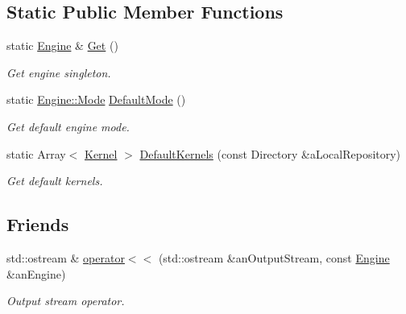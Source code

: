 \subsection*{Static Public Member Functions}
\begin{DoxyCompactItemize}
\item 
static \hyperlink{classlibrary_1_1physics_1_1env_1_1ephem_1_1spice_1_1_engine}{Engine} \& \hyperlink{classlibrary_1_1physics_1_1env_1_1ephem_1_1spice_1_1_engine_a9d5058448b12c353edcf5a420cec2745}{Get} ()
\begin{DoxyCompactList}\small\item\em Get engine singleton. \end{DoxyCompactList}\item 
static \hyperlink{classlibrary_1_1physics_1_1env_1_1ephem_1_1spice_1_1_engine_a2d185a63bce354bff9ad38810410eab4}{Engine\+::\+Mode} \hyperlink{classlibrary_1_1physics_1_1env_1_1ephem_1_1spice_1_1_engine_a0aef811b9d0dfcaffa9d9e8f62b9bb58}{Default\+Mode} ()
\begin{DoxyCompactList}\small\item\em Get default engine mode. \end{DoxyCompactList}\item 
static Array$<$ \hyperlink{classlibrary_1_1physics_1_1env_1_1ephem_1_1spice_1_1_kernel}{Kernel} $>$ \hyperlink{classlibrary_1_1physics_1_1env_1_1ephem_1_1spice_1_1_engine_afdecf7e76737dd44ed1729dfef8a54a8}{Default\+Kernels} (const Directory \&a\+Local\+Repository)
\begin{DoxyCompactList}\small\item\em Get default kernels. \end{DoxyCompactList}\end{DoxyCompactItemize}
\subsection*{Friends}
\begin{DoxyCompactItemize}
\item 
std\+::ostream \& \hyperlink{classlibrary_1_1physics_1_1env_1_1ephem_1_1spice_1_1_engine_a880dd680a3b5444757480fafd1a52679}{operator$<$$<$} (std\+::ostream \&an\+Output\+Stream, const \hyperlink{classlibrary_1_1physics_1_1env_1_1ephem_1_1spice_1_1_engine}{Engine} \&an\+Engine)
\begin{DoxyCompactList}\small\item\em Output stream operator. \end{DoxyCompactList}\end{DoxyCompactItemize}


